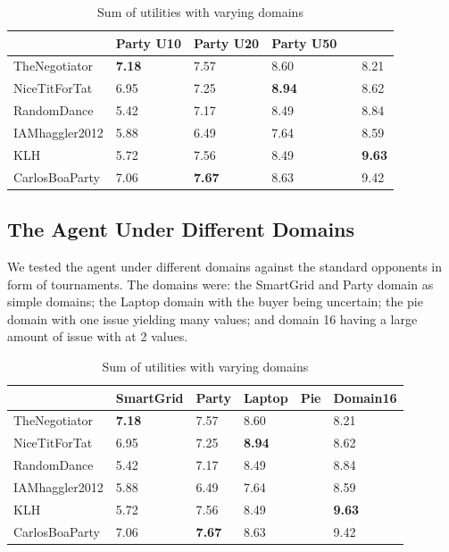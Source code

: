 \documentclass[a4paper,11pt]{article}
\theoremstyle{mytheor}
\begin{document}
\begin{table}[htb]
\centering
\begin{tabular}{l||lllll}
\hline
                & Party U10         & Party U20              & Party U50      \\ \hline\hline
TheNegotiator   & \textbf{7.18}  & 7.57 & 8.60  &  & 8.21   \\ 
NiceTitForTat   & 6.95  & 7.25 & \textbf{8.94}  &  & 8.62   \\ 
RandomDance     & 5.42  & 7.17 & 8.49  &  & 8.84 \\ 
IAMhaggler2012  & 5.88  & 6.49 & 7.64  &  & 8.59  \\ 
KLH             & 5.72  & 7.56 & 8.49  &  & \textbf{9.63}   \\ 
CarlosBoaParty  & 7.06  & \textbf{7.67} & 8.63  &  & 9.42   \\ 
\end{tabular}
\caption{Sum of utilities with varying domains}
\end{table}

\subsection{The Agent Under Different Domains}
We tested the agent under different domains against the standard opponents in form of tournaments. The domains were: the SmartGrid and Party domain as simple domains; the Laptop domain with the buyer being uncertain; the pie domain with one issue yielding many values; and domain 16 having a large amount of issue with at 2 values.

\begin{table}[htb]
\centering
\begin{tabular}{l||lllll}
\hline
                & SmartGrid         & Party              & Laptop             & Pie & Domain16      \\ \hline\hline
TheNegotiator   & \textbf{7.18}  & 7.57 & 8.60  &  & 8.21   \\ 
NiceTitForTat   & 6.95  & 7.25 & \textbf{8.94}  &  & 8.62   \\ 
RandomDance     & 5.42  & 7.17 & 8.49  &  & 8.84 \\ 
IAMhaggler2012  & 5.88  & 6.49 & 7.64  &  & 8.59  \\ 
KLH             & 5.72  & 7.56 & 8.49  &  & \textbf{9.63}   \\ 
CarlosBoaParty  & 7.06  & \textbf{7.67} & 8.63  &  & 9.42   \\ 
\end{tabular}
\caption{Sum of utilities with varying domains}
\end{table}
\end{document}
